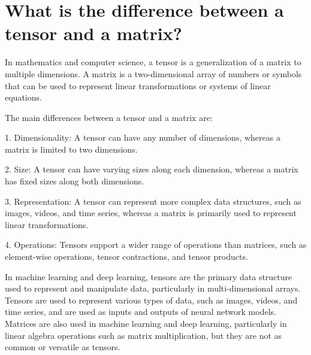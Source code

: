 \section{What is the difference between a tensor and a matrix?}
In mathematics and computer science, a tensor is a generalization of a matrix to multiple dimensions. A matrix is a two-dimensional array of numbers or symbols that can be used to represent linear transformations or systems of linear equations.

The main differences between a tensor and a matrix are:

1. Dimensionality: A tensor can have any number of dimensions, whereas a matrix is limited to two dimensions.

2. Size: A tensor can have varying sizes along each dimension, whereas a matrix has fixed sizes along both dimensions.

3. Representation: A tensor can represent more complex data structures, such as images, videos, and time series, whereas a matrix is primarily used to represent linear transformations.

4. Operations: Tensors support a wider range of operations than matrices, such as element-wise operations, tensor contractions, and tensor products.

In machine learning and deep learning, tensors are the primary data structure used to represent and manipulate data, particularly in multi-dimensional arrays. Tensors are used to represent various types of data, such as images, videos, and time series, and are used as inputs and outputs of neural network models. Matrices are also used in machine learning and deep learning, particularly in linear algebra operations such as matrix multiplication, but they are not as common or versatile as tensors.

